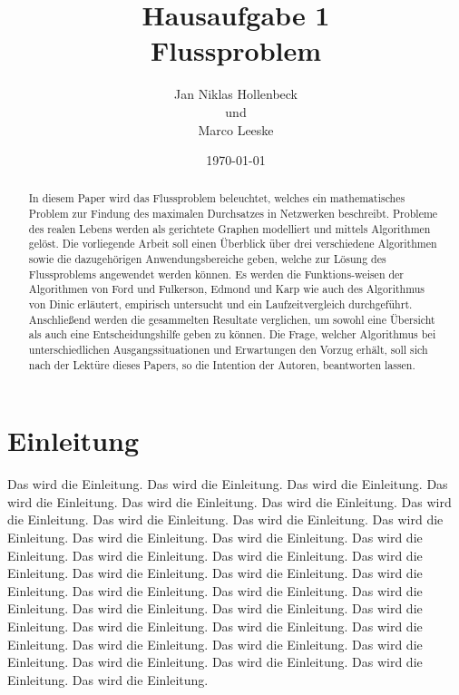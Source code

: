 \documentclass[11pt]{article}
\title{Hausaufgabe 1 \\ Flussproblem}
\author{Jan Niklas Hollenbeck \\ und \\ Marco Leeske}
\date{\today}
\begin{document}
\maketitle

\newpage

\begin{abstract}

In diesem Paper wird das Flussproblem beleuchtet, welches ein mathematisches Problem zur Findung des maximalen Durchsatzes in Netzwerken beschreibt. Probleme des realen Lebens werden als gerichtete Graphen modelliert und mittels Algorithmen gel\"ost. Die vorliegende Arbeit soll einen \"Uberblick \"uber drei verschiedene Algorithmen sowie die dazugeh\"origen Anwendungsbereiche geben, welche zur L\"osung des Flussproblems angewendet werden k\"onnen. Es werden die Funktions-weisen der Algorithmen von Ford und Fulkerson, Edmond und Karp wie auch des Algorithmus von Dinic erl\"autert, empirisch untersucht und ein Laufzeitvergleich durchgef\"uhrt. Anschließend werden die gesammelten Resultate verglichen, um sowohl eine \"Ubersicht als auch eine Entscheidungshilfe geben zu k\"onnen. Die Frage, welcher Algorithmus bei unterschiedlichen Ausgangssituationen und Erwartungen den Vorzug erh\"alt, soll sich nach der Lekt\"ure dieses Papers, so die Intention der Autoren, beantworten lassen. 

\end{abstract}


\section{Einleitung}
\label{Einleitung}

Das wird die Einleitung. Das wird die Einleitung. Das wird die Einleitung. Das wird die Einleitung. Das wird die Einleitung. Das wird die Einleitung. Das wird die Einleitung. Das wird die Einleitung. Das wird die Einleitung. Das wird die Einleitung. Das wird die Einleitung. Das wird die Einleitung. Das wird die Einleitung. Das wird die Einleitung. Das wird die Einleitung. Das wird die Einleitung. Das wird die Einleitung. Das wird die Einleitung. Das wird die Einleitung. Das wird die Einleitung. Das wird die Einleitung. Das wird die Einleitung. Das wird die Einleitung. Das wird die Einleitung. Das wird die Einleitung. Das wird die Einleitung. Das wird die Einleitung. Das wird die Einleitung. Das wird die Einleitung. Das wird die Einleitung. Das wird die Einleitung. Das wird die Einleitung. Das wird die Einleitung. Das wird die Einleitung. Das wird die Einleitung. 
\end{document}
